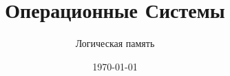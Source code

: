 \documentclass[handout,12pt]{beamer}
\title{Операционные Системы}
\subtitle{Логическая память}
\date{\today}
\begin{document}
  \begin{frame}
    \titlepage
  \end{frame}
  
\end{document}
